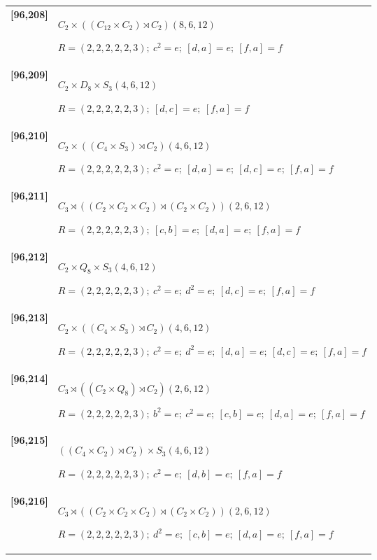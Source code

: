 \documentclass[UTF8,fontset=fandol,11pt,a4paper]{ctexart}
\begin{document}
\begin{longtable}{@{}p{17mm}>{\raggedright\arraybackslash}p{141mm}@{}}
\textbf{[96,208]} & $C_{2}\times ((C_{12}\times C_{2})\rtimes C_{2})$\quad $(8,6,12)$\par\(R=(2,2,2,2,2,3);\allowbreak\ c^{2}=e;\allowbreak\ [d,a]=e;\allowbreak\ [f,a]=f\)\\[3pt]

\textbf{[96,209]} & $C_{2}\times D_{8}\times S_{3}$\quad $(4,6,12)$\par\(R=(2,2,2,2,2,3);\allowbreak\ [d,c]=e;\allowbreak\ [f,a]=f\)\\[3pt]

\textbf{[96,210]} & $C_{2}\times ((C_{4}\times S_{3})\rtimes C_{2})$\quad $(4,6,12)$\par\(R=(2,2,2,2,2,3);\allowbreak\ c^{2}=e;\allowbreak\ [d,a]=e;\allowbreak\ [d,c]=e;\allowbreak\ [f,a]=f\)\\[3pt]

\textbf{[96,211]} & $C_{3}\rtimes ((C_{2}\times C_{2}\times C_{2})\rtimes (C_{2}\times C_{2}))$\quad $(2,6,12)$\par\(R=(2,2,2,2,2,3);\allowbreak\ [c,b]=e;\allowbreak\ [d,a]=e;\allowbreak\ [f,a]=f\)\\[3pt]

\textbf{[96,212]} & $C_{2}\times Q_{8}\times S_{3}$\quad $(4,6,12)$\par\(R=(2,2,2,2,2,3);\allowbreak\ c^{2}=e;\allowbreak\ d^{2}=e;\allowbreak\ [d,c]=e;\allowbreak\ [f,a]=f\)\\[3pt]

\textbf{[96,213]} & $C_{2}\times ((C_{4}\times S_{3})\rtimes C_{2})$\quad $(4,6,12)$\par\(R=(2,2,2,2,2,3);\allowbreak\ c^{2}=e;\allowbreak\ d^{2}=e;\allowbreak\ [d,a]=e;\allowbreak\ [d,c]=e;\allowbreak\ [f,a]=f\)\\[3pt]

\textbf{[96,214]} & $C_{3}\rtimes ((C_{2}\times Q_{8})\rtimes C_{2})$\quad $(2,6,12)$\par\(R=(2,2,2,2,2,3);\allowbreak\ b^{2}=e;\allowbreak\ c^{2}=e;\allowbreak\ [c,b]=e;\allowbreak\ [d,a]=e;\allowbreak\ [f,a]=f\)\\[3pt]

\textbf{[96,215]} & $((C_{4}\times C_{2})\rtimes C_{2})\times S_{3}$\quad $(4,6,12)$\par\(R=(2,2,2,2,2,3);\allowbreak\ c^{2}=e;\allowbreak\ [d,b]=e;\allowbreak\ [f,a]=f\)\\[3pt]

\textbf{[96,216]} & $C_{3}\rtimes ((C_{2}\times C_{2}\times C_{2})\rtimes (C_{2}\times C_{2}))$\quad $(2,6,12)$\par\(R=(2,2,2,2,2,3);\allowbreak\ d^{2}=e;\allowbreak\ [c,b]=e;\allowbreak\ [d,a]=e;\allowbreak\ [f,a]=f\)\\[3pt]


\end{longtable}
\end{document}
